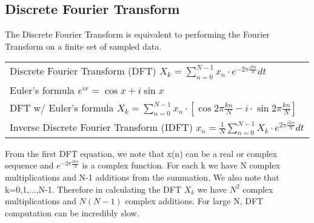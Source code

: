 \documentclass{article}
\begin{document}
\subsection{Discrete Fourier Transform}
The Discrete Fourier Transform is equivalent to performing the Fourier Transform on a finite set of sampled data.
\begin{center}
    \begin{tabular}{l}
Discrete Fourier Transform (DFT)
$X_{k} = \sum_{n=0}^{N-1} x_{n} \cdot e^{-2\pi \frac{ikn}{N}} dt$ \\
Euler's formula
$e^{ix} = \cos{x}+i\sin{x}$ \\
DFT w/ Euler's formula
$X_{k} = \sum_{n=0}^{N-1} x_{n} \cdot [\cos{2\pi\frac{kn}{N}}-i\cdot\sin{2\pi\frac{kn}{N}}]$ \\
Inverse Discrete Fourier Transform (IDFT)
$x_{n} = \frac{1}{N}\sum_{n=0}^{N-1} X_{k} \cdot e^{2\pi \frac{ikn}{N}} dt$ \\
\end{tabular}
\end{center}
From the first DFT equation, we note that x(n) can be a real or complex sequence and $e^{-2\pi \frac{ikn}{N}}$ is a complex function. For each k we have N complex multiplications and N-1 additions from the summation. We also note that k=0,1,...,N-1. Therefore in calculating the DFT $X_{k}$ we have $N^{2}$ complex multiplications and $N(N-1)$ complex additions.
For large N, DFT computation can be incredibly slow. 

\end{document}
